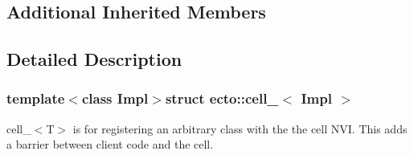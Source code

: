 \subsection*{Additional Inherited Members}


\subsection{Detailed Description}
\subsubsection*{template$<$class Impl$>$struct ecto\-::cell\-\_\-$<$ Impl $>$}

cell\-\_\-$<$\-T$>$ is for registering an arbitrary class with the the cell N\-V\-I. This adds a barrier between client code and the cell. 

